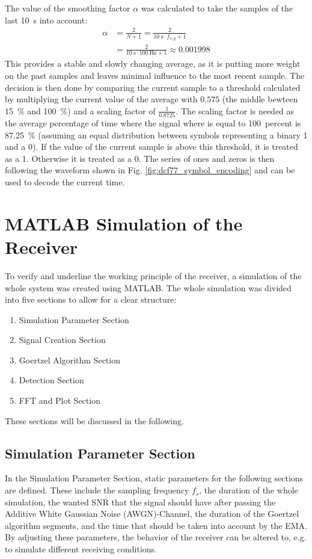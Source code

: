 \documentclass[conference]{IEEEtran}
\begin{document}
\FloatBarrier\noindent
The value of the smoothing factor $\alpha$ was calculated to take the samples of the last \SI{10}{\second} into account:
\begin{equation}
    \begin{split}
        \alpha &= \frac{2}{N + 1} = \frac{2}{\SI{10}{\second} \cdot f_{s,g} + 1}\\
        &= \frac{2}{\SI{10}{\second} \cdot \SI{100}{\hertz} + 1} \approx 0.001998
    \end{split}
\end{equation}
This provides a stable and slowly changing average, as it is putting more weight on the past samples and leaves minimal influence to the most recent sample.
The decision is then done by comparing the current sample to a threshold calculated by multiplying the current value of the average with $0.575$ (the middle bewteen \SI{15}{\percent} and \SI{100}{\percent}) and a scaling factor of $\frac{1}{0.8725}$.
The scaling factor is needed as the average percentage of time where the signal where is equal to \SI{100}{percent} is \SI{87.25}{\percent} (assuming an equal distribution between symbols representing a binary 1 and a 0).
If the value of the current sample is above this threshold, it is treated as a 1.
Otherwise it is treated as a 0.
The series of ones and zeros is then following the waveform shown in Fig. \ref{fig:dcf77_symbol_encoding} and can be used to decode the current time. 

\section{MATLAB Simulation of the Receiver}
To verify and underline the working principle of the receiver, a simulation of the whole system was created using MATLAB.
The whole simulation was divided into five sections to allow for a clear structure:
\begin{enumerate}
    \item Simulation Parameter Section
    \item Signal Creation Section
    \item Goertzel Algorithm Section
    \item Detection Section
    \item FFT and Plot Section
\end{enumerate}
These sections will be discussed in the following.

\subsection{Simulation Parameter Section}
In the Simulation Parameter Section, static parameters for the following sections are defined.
These include the sampling frequency $f_{s}$, the duration of the whole simulation, the wanted SNR that the signal should have after passing the Additive White Gaussian Noise (AWGN)-Channel, the duration of the Goertzel algorithm segments, and the time that should
be taken into account by the EMA.
By adjusting these parameters, the behavior of the receiver can be altered to, e.g. to simulate different receiving conditions.
\end{document}
